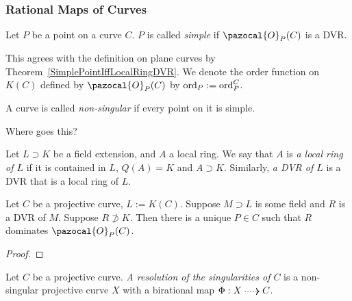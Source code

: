     \subsubsection{Rational Maps of Curves}
        \begin{definition}
            Let $P$ be a point on a curve $C$. $P$ is called \textit{simple} if $\pazocal{O}_P(C)$ is a DVR. 
        \end{definition}
        \begin{remark}
            This agrees with the definition on plane curves by Theorem~\ref{SimplePointIffLocalRingDVR}. We denote the order function on $K(C)$ defined by $\pazocal{O}_P(C)$ by $\mathrm{ord}_P:=\mathrm{ord}_P^C$. 
        \end{remark}
        \begin{definition}
            A curve is called \textit{non-singular} if every point on it is simple.
        \end{definition}
        {\Large Where goes this?}
        \begin{definition}
            Let $L\supset K$ be a field extension, and $A$ a local ring. We say that $A$ is \textit{a local ring of $L$} if it is contained in $L$, $Q(A)=K$ and $A\supset K$. Similarly, \textit{a DVR of $L$} is a DVR that is a local ring of $L$.  
        \end{definition}
        \begin{theorem}
            Let $C$ be a projective curve, $L:=K(C)$. Suppose $M\supset L$ is some field and $R$ is a DVR of $M$. Suppose $R\not\supset K$. Then there is a unique $P\in C$ such that $R$ dominates $\pazocal{O}_P(C)$. 
        \end{theorem}
        \begin{proof}
            
        \end{proof}
        \begin{corollary}
            
        \end{corollary}
        \begin{definition}
            Let $C$ be a projective curve. \textit{A resolution of the singularities of $C$} is a non-singular projective curve $X$ with a birational map $\Phi : X\dottedarrow C$. 
        \end{definition}
